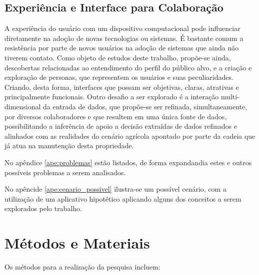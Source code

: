 \subsection{Experiência e Interface para Colaboração}
\label{subsec:experiencia_interface_colaboracao}

A experiência do usuário com um dispositivo computacional pode influenciar diretamente na adoção de novas tecnologias ou sistemas. É bastante comum a resistência por parte de novos usuários na adoção de sistemas que ainda não tiverem contato. Como objeto de estudos deste trabalho, propõe-se ainda, descobertas relacionadas ao entendimento do perfil do público alvo, e a criação e exploração de personas, que representem os usuários e suas peculiaridades. Criando, desta forma, interfaces que possam ser objetivas, claras, atrativas e principalmente funcionais. Outro desafio a ser explorado é a interação multi-dimensional da entrada de dados, que propõe-se ser refinada, simultaneamente, por diversos colaboradores e que resultem em uma única fonte de dados, possibilitando a inferência de apoio a decisão extraídas de dados refinados e alinhados com as realidades do cenário agrícola apontado por parte da cadeia que já atua na manutenção desta propriedade.

No apêndice \ref{ape:problemas} estão listados, de forma expandandia estes e outros possíveis problemas a serem analisados.

No apêncide \ref{ape:cenario_possivel} ilustra-se um possível cenário, com a utilização de um aplicativo hipotético aplicando alguns dos conceitos a serem explorados pelo trabalho.

\section{Métodos e Materiais}
\label{sec:metodos_materiais}
		
Os métodos para a realização da pesquisa incluem:

